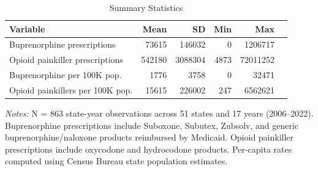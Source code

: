 \begin{table}[H]
\centering
\caption{Summary Statistics}
\begin{threeparttable}
\begin{tabular}{lrrrrr}
\toprule
Variable & Mean & SD & Min & Max \\
\midrule
Buprenorphine prescriptions & 73615 & 146032 & 0 & 1206717 \\
Opioid painkiller prescriptions & 542180 & 3088304 & 4873 & 72011252 \\
Buprenorphine per 100K pop. & 1776 & 3758 & 0 & 32471 \\
Opioid painkillers per 100K pop. & 15615 & 226002 & 247 & 6562621 \\
\bottomrule
\end{tabular}
\begin{tablenotes}[flushleft]
\small
\item \textit{Notes:} N = 863 state-year observations across 51 states and 17 years (2006--2022). Buprenorphine prescriptions include Suboxone, Subutex, Zubsolv, and generic buprenorphine/naloxone products reimbursed by Medicaid. Opioid painkiller prescriptions include oxycodone and hydrocodone products. Per-capita rates computed using Census Bureau state population estimates.
\end{tablenotes}
\end{threeparttable}
\label{tab:summary}
\end{table}

